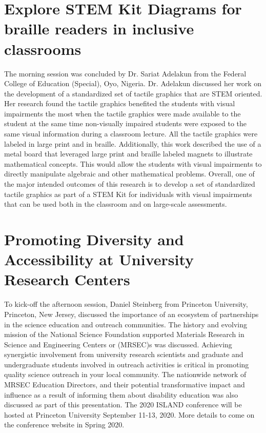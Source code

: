 \documentclass[11.5pt]{sig-alternate} %
\begin{document}
\begin{large}
\section*{Explore STEM Kit Diagrams for braille readers in inclusive classrooms}
The morning session was concluded by Dr. Sariat Adelakun from the Federal College of Education (Special), Oyo, Nigeria. Dr. Adelakun discussed her work on the development of a standardized set of tactile graphics that are STEM oriented. Her research found the tactile graphics benefited the students with visual impairments the most when the tactile graphics were made available to the student at the same time non-visually impaired students were exposed to the same visual information during a classroom lecture. All the tactile graphics were labeled in large print and in braille. Additionally, this work described the use of a metal board that leveraged large print and braille labeled magnets to illustrate mathematical concepts. This would allow the students with visual impairments to directly manipulate algebraic and other mathematical problems. Overall, one of the major intended outcomes of this research is to develop a set of standardized tactile graphics as part of a STEM Kit for individuals with visual impairments that can be used both in the classroom and on large-scale assessments. 


\section*{Promoting Diversity and Accessibility at University Research Centers}
To kick-off the afternoon session, Daniel Steinberg from Princeton University, Princeton, New Jersey, discussed the importance of an ecosystem of partnerships in the science education and outreach communities. The history and evolving mission of the National Science Foundation supported Materials Research in Science and Engineering Centers or (MRSEC)s was discussed. Achieving synergistic involvement from university research scientists and graduate and undergraduate students involved in outreach activities is critical in promoting quality science outreach in your local community. The nationwide network of MRSEC Education Directors, and their potential transformative impact and influence as a result of informing them about disability education was also discussed as part of this presentation. The 2020 ISLAND conference will be hosted at Princeton University September 11-13, 2020. More details to come on the conference website in Spring 2020.



\end{large}
\end{document}
